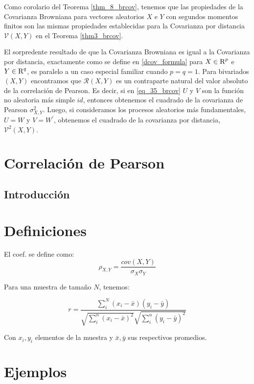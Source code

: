 	Como corolario del Teorema \ref{thm_8_brcov}, tenemos que las propiedades de la Covarianza Browniana para vectores aleatorios $X$ e $Y$ con segundos momentos finitos son las mismas propiedades establecidas para la Covarianza por distancia $\mathcal{V}(X, Y)$ en el Teorema \ref{thm3_brcov}.
	
	El sorpredente resultado de que la Covarianza Browniana es igual a la Covarianza por distancia, exactamente como se define en \ref{dcov_formula} para $X \in \textsc{R}^p$ e $Y \in \textsc{R}^q$, es paralelo a un caso especial familiar cuando $p=q=1$. Para bivariados $(X, Y)$ encontramos que $\mathcal{R}(X, Y)$ es un contraparte natural del valor absoluto de la correlaci\'on de Pearson. Es decir, si en \ref{eq_35_brcov} $U$ y $V$ son la funci\'on no aleatoria m\'as simple $id$, entonces obtenemos el cuadrado de la covarianza de Pearson $\sigma_{X, Y}^2$. Luego, si consideramos los procesos aleatorios m\'as fundamentales, $U=W$ y $V=W^{\prime}$, obtenemos el cuadrado de la covarianza por distancia, $\mathcal{V}^2(X, Y)$.

\section[]{Correlaci\'on de Pearson}

	\subsection{Introducci\'on}

		
	 
	\section{Definiciones}
	
	El coef. se define como:
	\begin{equation}\label{pearson_orig}
		\rho_{X,Y}=\frac{cov(X,Y)}{\sigma_X\sigma_Y}
	\end{equation}
	
	Para una muestra de tama\~no $N$, tenemos:
	
	\begin{equation}\label{pearson_r}
		r=\frac{\sum_{i}^N\left(x_{i}-\bar{x}\right)\left(y_{i}-\bar{y}\right)}{\sqrt{\sum_{i}^n\left(x_{i}-\bar{x}\right)^{2}} \sqrt{\sum_{i}^n\left(y_{i}-\bar{y}\right)^{2}}}
	\end{equation}
	
	Con $x_i,y_i$ elementos de la muestra y $\bar{x},\bar{y}$ sus respectivos promedios.

\section{Ejemplos}


	\newpage